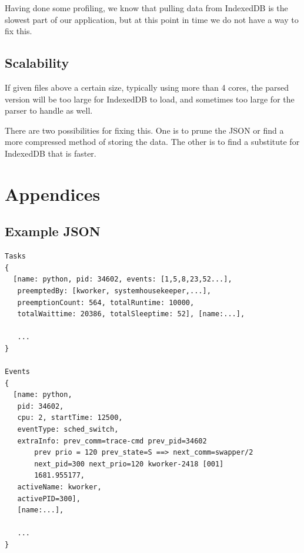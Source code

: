\documentclass{hmcclinic}
\begin{document}
Having done some profiling, we know that pulling data from IndexedDB is the
slowest part of our application, but at this point in time we do not have a way
to fix this.

\section{Scalability}
If given files above a certain size, typically using more than 4
cores, the parsed version will be too large for IndexedDB to load, and
sometimes too large for the parser to handle as well.

There are two possibilities for fixing this. One is to prune the JSON or
find a more compressed method of storing the data. The other is to find a
substitute for IndexedDB that is faster.

\chapter{Appendices}
\newpage
\appendix
\renewcommand{\thesection}{\Alph{section}}
\section{Example JSON} \label{App:AppendixA}

\begin{verbatim}
Tasks
{
  [name: python, pid: 34602, events: [1,5,8,23,52...], 
   preemptedBy: [kworker, systemhousekeeper,...], 
   preemptionCount: 564, totalRuntime: 10000,
   totalWaittime: 20386, totalSleeptime: 52], [name:...],

   ...   
}

Events
{
  [name: python, 
   pid: 34602, 
   cpu: 2, startTime: 12500, 
   eventType: sched_switch,
   extraInfo: prev_comm=trace-cmd prev_pid=34602 
       prev prio = 120 prev_state=S ==> next_comm=swapper/2 
       next_pid=300 next_prio=120 kworker-2418 [001]
       1681.955177, 
   activeName: kworker, 
   activePID=300], 
   [name:...], 

   ...
}
\end{verbatim}
\newpage

\newpage
\end{document}

